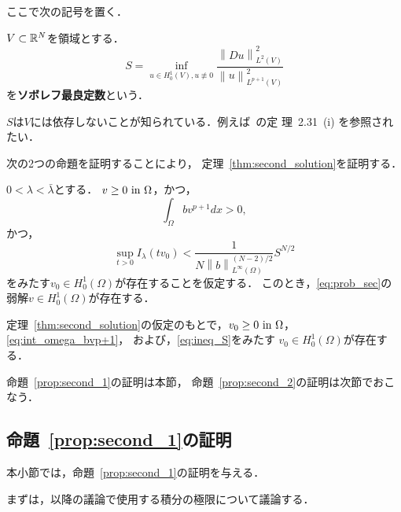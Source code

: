 ここで次の記号を置く．

\begin{defn} \label{defn:S_def}
 $V \subset \mathbb{R}^N$を領域とする．
 \begin{equation}
  S = \inf_{u \in H^1_0(V), u \not \equiv 0}
 \frac{\left\| Du \right\|_{L^2(V)}^2}{\left\| u
                                       \right\|_{L^{p+1}(V)}^2}  
 \label{eq:S_def}
 \end{equation}
 を{\bf ソボレフ最良定数}という．
\end{defn}

$S$は$V$には依存しないことが知られている．例えば~\cite{田中200808}の定
理~2.31~(i) を参照されたい．

次の2つの命題を証明することにより，
定理~\ref{thm:second_solution}を証明する．

\begin{prop} \label{prop:second_1}
 $0 < \lambda < \bar{\lambda}$とする．
 $v \geq 0 ~\text{in}~ \Omega$，かつ，
 \begin{equation}
  \int_\Omega b v^{p+1} dx > 0, \label{eq:int_omega_bvp+1}  
 \end{equation}
 かつ，
 \begin{equation}
  \sup_{t > 0} I_\lambda (tv_0) < 
   \frac{1}{N\left\| b
             \right\|_{L^\infty(\Omega)} ^{(N-2)/2}} S^{N/2} 
   \label{eq:ineq_S}
 \end{equation}
 をみたす$v_0 \in H_0^1(\Omega)$が存在することを仮定する．
 このとき，\ref{eq:prob_sec}の弱解$v \in H_0^1(\Omega)$が存在する．
\end{prop}

\begin{prop} \label{prop:second_2}
 定理~\ref{thm:second_solution}の仮定のもとで，$v_0 \geq 0 ~\text{in}~
 \Omega$，\eqref{eq:int_omega_bvp+1}，
 および，\eqref{eq:ineq_S}をみたす
 $v_0 \in H_0^1(\Omega)$が存在する．
\end{prop}

命題~\ref{prop:second_1}の証明は本節，
命題~\ref{prop:second_2}の証明は次節でおこなう．

\subsection{命題~\ref{prop:second_1}の証明}

本小節では，命題~\ref{prop:second_1}の証明を与える．

まずは，以降の議論で使用する積分の極限について議論する．

